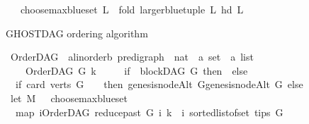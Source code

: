 \begin{isabellebody}
\ \ \ {\isachardoublequoteopen}choose{\isacharunderscore}{\kern0pt}max{\isacharunderscore}{\kern0pt}blue{\isacharunderscore}{\kern0pt}set\ L\ {\isacharequal}{\kern0pt}\ fold\ {\isacharparenleft}{\kern0pt}larger{\isacharunderscore}{\kern0pt}blue{\isacharunderscore}{\kern0pt}tuple{\isacharparenright}{\kern0pt}\ L\ {\isacharparenleft}{\kern0pt}hd\ L{\isacharparenright}{\kern0pt}{\isachardoublequoteclose}%
\begin{isamarkuptext}%
GHOSTDAG ordering algorithm%
\end{isamarkuptext}\isamarkuptrue%
\isamarkupfalse%
\ OrderDAG\ {\isacharcolon}{\kern0pt}{\isacharcolon}{\kern0pt}\ {\isachardoublequoteopen}{\isacharparenleft}{\kern0pt}{\isacharprime}{\kern0pt}a{\isacharcolon}{\kern0pt}{\isacharcolon}{\kern0pt}linorder{\isacharcomma}{\kern0pt}{\isacharprime}{\kern0pt}b{\isacharparenright}{\kern0pt}\ pre{\isacharunderscore}{\kern0pt}digraph\ {\isasymRightarrow}\ nat\ {\isasymRightarrow}\ {\isacharparenleft}{\kern0pt}{\isacharprime}{\kern0pt}a\ set\ {\isasymtimes}\ {\isacharprime}{\kern0pt}a\ list{\isacharparenright}{\kern0pt}{\isachardoublequoteclose}\ \isanewline
\ \ \isanewline
\ \ \ \ {\isachardoublequoteopen}OrderDAG\ G\ k\ {\isacharequal}{\kern0pt}\ \ \isanewline
\ \ {\isacharparenleft}{\kern0pt}if\ {\isacharparenleft}{\kern0pt}{\isasymnot}\ blockDAG\ G{\isacharparenright}{\kern0pt}\ then\ {\isacharparenleft}{\kern0pt}{\isacharbraceleft}{\kern0pt}{\isacharbraceright}{\kern0pt}{\isacharcomma}{\kern0pt}{\isacharbrackleft}{\kern0pt}{\isacharbrackright}{\kern0pt}{\isacharparenright}{\kern0pt}\ else\ \isanewline
\ \ if\ {\isacharparenleft}{\kern0pt}card\ {\isacharparenleft}{\kern0pt}verts\ G{\isacharparenright}{\kern0pt}\ {\isacharequal}{\kern0pt}\ {}{\isacharparenright}{\kern0pt}\ \ then\ {\isacharparenleft}{\kern0pt}{\isacharbraceleft}{\kern0pt}genesis{\isacharunderscore}{\kern0pt}nodeAlt\ G{\isacharbraceright}{\kern0pt}{\isacharcomma}{\kern0pt}{\isacharbrackleft}{\kern0pt}genesis{\isacharunderscore}{\kern0pt}nodeAlt\ G{\isacharbrackright}{\kern0pt}{\isacharparenright}{\kern0pt}\ else\isanewline
\ let\ M\ {\isacharequal}{\kern0pt}\ \ choose{\isacharunderscore}{\kern0pt}max{\isacharunderscore}{\kern0pt}blue{\isacharunderscore}{\kern0pt}set\ \isanewline
\ \ {\isacharparenleft}{\kern0pt}{\isacharparenleft}{\kern0pt}map\ {\isacharparenleft}{\kern0pt}{\isasymlambda}i{\isachardot}{\kern0pt}{\isacharparenleft}{\kern0pt}{\isacharparenleft}{\kern0pt}{\isacharparenleft}{\kern0pt}OrderDAG\ {\isacharparenleft}{\kern0pt}reduce{\isacharunderscore}{\kern0pt}past\ G\ i{\isacharparenright}{\kern0pt}\ k{\isacharparenright}{\kern0pt}{\isacharparenright}{\kern0pt}\ {\isacharcomma}{\kern0pt}\ i{\isacharparenright}{\kern0pt}{\isacharparenright}{\kern0pt}\ {\isacharparenleft}{\kern0pt}sorted{\isacharunderscore}{\kern0pt}list{\isacharunderscore}{\kern0pt}of{\isacharunderscore}{\kern0pt}set\ {\isacharparenleft}{\kern0pt}tips\ G{\isacharparenright}{\kern0pt}{\isacharparenright}{\kern0pt}{\isacharparenright}{\kern0pt}{\isacharparenright}{\kern0pt}\isanewline

\end{isabellebody}
